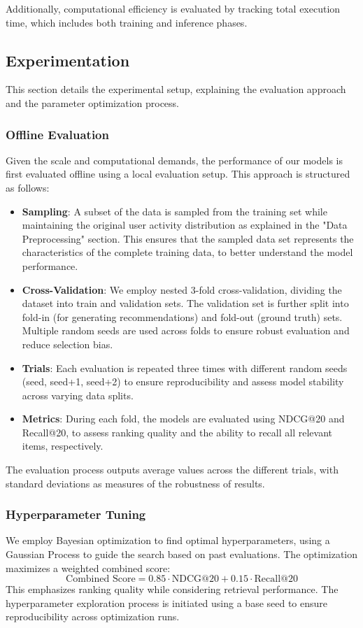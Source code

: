 \documentclass[conference,compsoc]{IEEEtran}
\begin{document}
Additionally, computational efficiency is evaluated by tracking total execution time, which includes both training and inference phases.

\subsection{Experimentation}
This section details the experimental setup, explaining the evaluation approach and the parameter optimization process.

\subsubsection{Offline Evaluation}
Given the scale and computational demands, the performance of our models is first evaluated offline using a local evaluation setup. This approach is structured as follows:
\begin{itemize}
    \item \textbf{Sampling}: A subset of the data is sampled from the training set while maintaining the original user activity distribution as explained in  the "Data Preprocessing" section. This ensures that the sampled data set represents the characteristics of the complete training data, to better understand the model performance.
\item \textbf{Cross-Validation}: We employ nested 3-fold cross-validation, dividing the dataset into train and validation sets. The validation set is further split into fold-in (for generating recommendations) and fold-out (ground truth) sets. Multiple random seeds are used across folds to ensure robust evaluation and reduce selection bias.
\item \textbf{Trials}: Each evaluation is repeated three times with different random seeds (seed, seed+1, seed+2) to ensure reproducibility and assess model stability across varying data splits.
    \item \textbf{Metrics}: During each fold, the models are evaluated using NDCG@20 and Recall@20, to assess ranking quality and the ability to recall all relevant items, respectively.
\end{itemize}
 The evaluation process outputs average values across the different trials, with standard deviations as measures of the robustness of results.

\subsubsection{Hyperparameter Tuning}
We employ Bayesian optimization to find optimal hyperparameters, using a Gaussian Process to guide the search based on past evaluations. The optimization maximizes a weighted combined score:
\begin{equation}
    \text{Combined Score} = 0.85 \cdot \text{NDCG@20} + 0.15 \cdot \text{Recall@20}
\end{equation}
This emphasizes ranking quality while considering retrieval performance. The hyperparameter exploration process is initiated using a base seed to ensure reproducibility across optimization runs.
\end{document}
